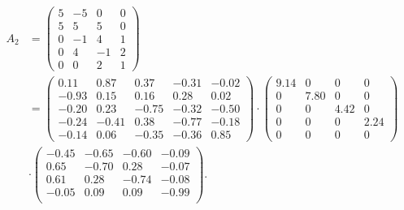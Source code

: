 \documentclass[
  course = {{16-811 Math Fundamentals for Robotics}},
  quartile = {{1}},
  assignment = 1,
  name = {{Kangle Deng}},
  email = {{kangled@andrew.cmu.edu}},
  firstexercise = 1
]{aga-homework}
\begin{document}
\begin{equation*}
\begin{aligned}
    A_2 & = 
    \left(
    \begin{array}{cccc}
        5 & -5 & 0 & 0 \\
        5 & 5 & 5 & 0 \\
        0 & -1 & 4 & 1 \\
        0 & 4 & -1 & 2 \\
        0 & 0 & 2 & 1
    \end{array}
    \right) 
    \\ 
    & =
    \left(
    \begin{array}{ccccc}
        0.11 & 0.87 & 0.37 & -0.31 & -0.02 \\
        -0.93 & 0.15 & 0.16 & 0.28 & 0.02 \\
        -0.20 & 0.23 & -0.75 & -0.32 & -0.50 \\
        -0.24 & -0.41 & 0.38 & -0.77 & -0.18 \\
        -0.14 & 0.06 & -0.35 & -0.36 & 0.85
    \end{array}
    \right) \cdot
    \left(
    \begin{array}{cccc}
        9.14 & 0 & 0 & 0  \\
        0 & 7.80 & 0 & 0 \\
        0 & 0 & 4.42 & 0 \\
        0 & 0 & 0 & 2.24 \\
        0 & 0 & 0 & 0
    \end{array}
    \right) 
    \\ & \cdot
    \left(
    \begin{array}{cccc}
        -0.45 & -0.65 & -0.60 & -0.09 \\
        0.65 & -0.70 & 0.28 & -0.07 \\
        0.61 & 0.28 & -0.74 & -0.08 \\
        -0.05 & 0.09 & 0.09 & -0.99 \\
    \end{array}
    \right).
\end{aligned}
\end{equation*}
\end{document}
